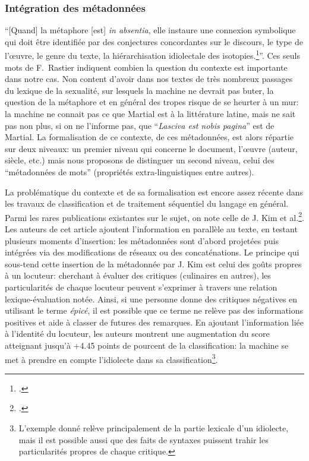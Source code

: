 
\subsubsection{Intégration des métadonnées}
\label{chap4:encodage:metadonnees}

\enquote{[Quand] la métaphore [est] \textit{in absentia}, elle instaure une connexion symbolique qui doit être identifiée par des conjectures concordantes sur le discours, le type de l'œuvre, le genre du texte, la hiérarchisation idiolectale des isotopies.\footcite[p. 98]{rastier_tropes_1994}}. Ces seuls mots de F.~Rastier indiquent combien la question du contexte est importante dans notre cas. Non content d'avoir dans nos textes de très nombreux passages du lexique de la sexualité, sur lesquels la machine ne devrait pas buter, la question de la métaphore et en général des tropes risque de se heurter à un mur: la machine ne connait pas ce que Martial est à la littérature latine, mais ne sait pas non plus, si on ne l'informe pas, que \enquote{\textit{Lasciva est nobis pagina}} est de Martial. La formalisation de ce contexte, de ces métadonnées, est alors répartie sur deux niveaux: un premier niveau qui concerne le document, l'œuvre (auteur, siècle, etc.) mais nous proposons de distinguer un second niveau, celui des \enquote{métadonnées de mots} (propriétés extra-linguistiques entre autres).

La problématique du contexte et de sa formalisation est encore assez récente dans les travaux de classification et de traitement séquentiel du langage en général. Parmi les rares publications existantes sur le sujet, on note celle de J. Kim et al.\footcite{kim_categorical_2019}. Les auteurs de cet article ajoutent l'information en parallèle au texte, en testant plusieurs moments d'insertion: les métadonnées sont d'abord projetées puis intégrées via des modifications de réseaux ou des concaténations. Le principe qui sous-tend cette insertion de la métadonnée par J. Kim est celui des goûts propres à un locuteur: cherchant à évaluer des critiques (culinaires en autres), les particularités de chaque locuteur peuvent s'exprimer à travers une relation lexique-évaluation notée. Ainsi, si une personne donne des critiques négatives en utilisant le terme \textit{épicé}, il est possible que ce terme ne relève pas des informations positives et aide à classer de futures des remarques. En ajoutant l'information liée à l'identité du locuteur, les auteurs montrent une augmentation du score atteignant jusqu'à +4.45 points de pourcent de la classification: la machine se met à prendre en compte l'idiolecte dans sa classification\footnote{L'exemple donné relève principalement de la partie lexicale d'un idiolecte, mais il est possible aussi que des faits de syntaxes puissent trahir les particularités propres de chaque critique.}.

